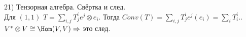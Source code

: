 21) Тензорная алгебра. Свёртка и след.\\
Для $(1, 1)$ $T=\sum_{i,j} T_j^i e^j\otimes e_i$. Тогда $Conv(T)=\sum_{i,j} T_j^i e^j(e_i)=\sum_i T^i_i.$. $V^*\otimes V \cong \Hom(V,V)\Rightarrow$ это след.\\
